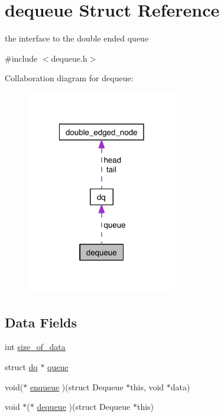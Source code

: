 \hypertarget{structdequeue}{\section{dequeue Struct Reference}
\label{structdequeue}
}


the interface to the double ended queue  




{\ttfamily \#include $<$dequeue.\-h$>$}



Collaboration diagram for dequeue\-:\nopagebreak
\begin{figure}[H]
\begin{center}
\leavevmode
\includegraphics[width=186pt]{structdequeue__coll__graph}
\end{center}
\end{figure}
\subsection*{Data Fields}
\begin{DoxyCompactItemize}
\item 
int \hyperlink{structdequeue_a8b1cacb0a459b9994cf7f0653e366d04}{size\-\_\-of\-\_\-data}
\item 
struct \hyperlink{dequeue__impl_8h_structdq}{dq} $\ast$ \hyperlink{structdequeue_a51fbcea7276e827ff78ca4c6a9d66d3e}{queue}
\item 
void($\ast$ \hyperlink{structdequeue_afd7779266d6b9dda030846a62fa26fad}{enqueue} )(struct Dequeue $\ast$this, void $\ast$data)
\item 
void $\ast$($\ast$ \hyperlink{structdequeue_aaaa21837723622119f76d2fa67ac51fc}{dequeue} )(struct Dequeue $\ast$this)
\end{DoxyCompactItemize}


